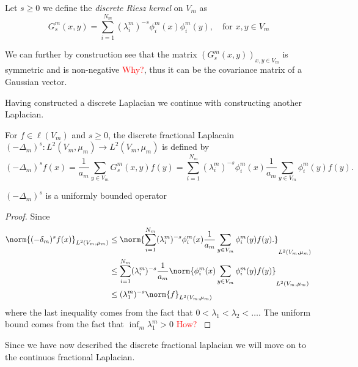 \begin{defi}
	Let $s \geq 0$ we define the \emph{discrete Riesz kernel} on $V_m$ as
	\begin{equation}
		G_s^{m}(x,y) = \sum_{i = 1}^{N_m} (\lambda_i^{m})^{-s} \phi_{i}^{m}(x)\phi_{i}^{m}(y), \quad \text{for }x, y \in V_m
	\end{equation}
\end{defi}

We can further by construction see that the matrix $(G_s^{m}(x,y))_{x, y \in V_m}$ is symmetric and is non-negative \textcolor{red}{Why?}, thus it can be the covariance matrix of a Gaussian vector.

Having constructed a discrete Laplacian we continue with constructing another Laplacian.

\begin{defi}\label{discreteFractionalLaplacian}
	For $f \in \ell(V_m)$ and $s \geq 0$, the discrete fractional Laplacain $(-\Delta_m)^{s}: L^{2}(V_m, \mu_m) \to L^{2}(V_m, \mu_m)$ is defined by
	\begin{equation}
		(-\Delta_{m})^{s}f(x) = \frac{1}{a_m} \sum_{y \in V_m} G_{s}^{m}(x,y)f(y) = \sum_{i = 1}^{N_m} (\lambda_{i}^{m})^{-s} \phi_{i}^{m}(x) \frac{1}{a_m} \sum_{y \in V_m} \phi_{i}^{m}(y)f(y).
	\end{equation}
\end{defi}

\begin{prop}
	$(-\Delta_{m})^{s}$ is a uniformly bounded operator
\end{prop}
\begin{proof}
	Since
	\begin{align}
		\norm{(-\delta_m)^{s}f(x)}_{L^{2}(V_m, \mu_m)} &\leq \norm{\sum_{i = 1}^{N_m} (\lambda_{i}^{m})^{-s} \phi_{i}^{m}(x) \frac{1}{a_m} \sum_{y \in V_m} \phi_{i}^{m}(y)f(y).}_{L^{2}(V_m, \mu_m)} \\
		& \leq \sum_{i = 1}^{N_m} (\lambda_{i}^{m})^{-s} \frac{1}{a_m}\norm{\phi_{i}^{m}(x)\sum_{y \in V_m} \phi_{i}^{m}(y)f(y)}_{L^{2}(V_m, \mu_m)} \\
		& \leq (\lambda_1^{m})^{-s} \norm{f}_{L^{2}(V_m, \mu_m)}
	\end{align}
	where the last inequality comes from the fact that $0 < \lambda_1 < \lambda_{2} < \ldots$. The uniform bound comes from the fact that $\inf_{m} \lambda_{1}^{m} > 0$ \textcolor{red}{How? \cite[lemma 5.2]{specAnal}}
\end{proof}


Since we have now described the discrete fractional laplacian we will move on to the continuos fractional Laplacian.

